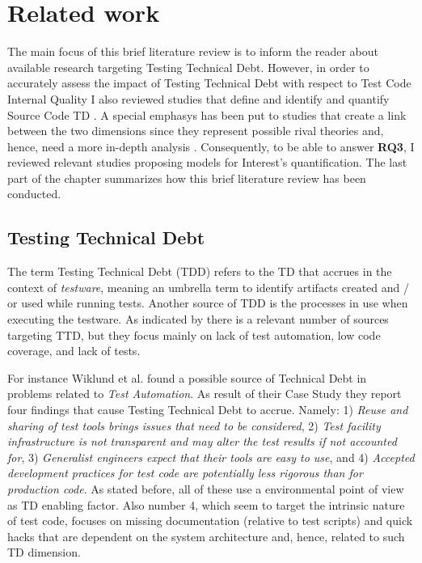 \chapter{Related work} \label{related_work}

The main focus of this brief literature review is to inform the reader about available research targeting Testing Technical Debt. However, in order to accurately assess the impact of Testing Technical Debt with respect to Test Code Internal Quality I also reviewed studies that define and identify and quantify Source Code TD \cite{mapping_study_td}. A special emphasys has been put to studies that create a link between the two dimensions since they represent possible rival theories and, hence, need a more in-depth analysis \cite{case_study_guide}. Consequently, to be able to answer \textbf{RQ3}, I reviewed relevant studies proposing models for Interest's quantification. The last part of the chapter summarizes how this brief literature review has been conducted.

\section{Testing Technical Debt} \label{testing_td}

The term Testing Technical Debt (TDD) refers to the TD that accrues in the context of \textit{testware}, meaning an umbrella term to identify artifacts created and / or used while running tests. Another source of TDD is the processes in use when executing the testware. As indicated by \cite{mapping_study_td, exploration_of_td, exploration_of_td2} there is a relevant number of sources targeting TTD, but they focus mainly on lack of test automation, low code coverage, and lack of tests.

For instance Wiklund et al. \cite{test_automation_td} found a possible source of Technical Debt in problems related to \textit{Test Automation}. As result of their Case Study they report four findings that cause Testing Technical Debt to accrue. Namely: 1) \textit{Reuse and sharing of test tools brings issues that need to be considered}, 2) \textit{Test facility infrastructure is not transparent and may alter the test results if not accounted for}, 3) \textit{Generalist engineers expect that their tools are easy to use}, and 4) \textit{Accepted development practices for test code are potentially less rigorous than for production code}. As stated before, all of these use a environmental point of view as TD enabling factor. Also number 4, which seem to target the intrinsic nature of test code, focuses on missing documentation (relative to test scripts) and quick hacks that are dependent on the system architecture and, hence, related to such TD dimension. 

